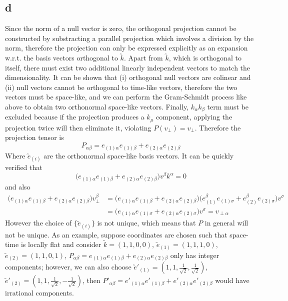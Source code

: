 \documentclass{article}
\begin{document}
\subsection*{d}
Since the norm of a null vector is zero, the orthogonal projection cannot be constructed by substracting a parallel projection which involves a division by the norm, therefore the projection can only be expressed explicitly as an expansion w.r.t. the basis vectors orthogonal to $\utilde{k}$. Apart from $\utilde{k}$, which is orthogonal to itself, there must exist two additional linearly independent vectors to match the dimensionality. It can be shown that (i) orthogonal null vectors are colinear and (ii) null vectors cannot be orthogonal to time-like vectors, therefore the two vectors must be space-like, and we can perform the Gram-Schmidt process like above to obtain two orthonormal space-like vectors. Finally, $k_\alpha k_\beta$ term must be excluded because if the projection produces a $k_\mu$ component, applying the projection twice will then eliminate it, violating $P(v_\perp) = v_\perp$. Therefore the projection tensor is
\[ P_{\alpha\beta} = e_{(1)\alpha}e_{(1)\beta} + e_{(2)\alpha}e_{(2)\beta}\]
Where $\utilde{e}_{(i)}$ are the orthonormal space-like basis vectors. It can be quickly verified that
\[  \Big(e_{(1)\alpha}e_{(1)\beta} + e_{(2)\alpha}e_{(2)\beta}\Big) v^\beta k^\alpha = 0 \]
and also
\begin{align*}
\Big(e_{(1)\alpha}e_{(1)\beta} + e_{(2)\alpha}e_{(2)\beta}\Big)v_\perp^\beta
&=  \Big(e_{(1)\alpha}e_{(1)\beta} + e_{(2)\alpha}e_{(2)\beta}\Big)
	\Big(e_{(1)}^\beta e_{(1)\sigma} + e_{(2)}^\beta e_{(2)\sigma}\Big)v^\sigma  \\
&= \Big(e_{(1)\alpha} e_{(1)\sigma} + e_{(2)\alpha} e_{(2)\sigma}\Big)v^\sigma = v_{\perp\alpha}
\end{align*}
However the choice of $\{ \utilde{e}_{(i)} \}$ is not unique, which means that $P$ in general will not be unique. As an example, suppose coordinates are chosen such that space-time is locally flat and consider $\utilde{k} = (1,1,0,0)$, $\utilde{e}_{(1)} = (1,1,1,0)$, $\utilde{e}_{(2)} = (1,1,0,1)$, $P_{\alpha\beta} = e_{(1)\alpha}e_{(1)\beta} + e_{(2)\alpha}e_{(2)\beta}$ only has integer components; however, we can also choose $\utilde{e}'_{(1)} = (1,1,\frac{1}{\sqrt{2}},\frac{1}{\sqrt{2}})$, $\utilde{e}'_{(2)} = (1,1, \frac{1}{\sqrt{2}},-\frac{1}{\sqrt{2}})$, then $P'_{\alpha\beta} = e'_{(1)\alpha}e'_{(1)\beta} + e'_{(2)\alpha}e'_{(2)\beta}$
would have irrational components.
\section{}
\end{document}
